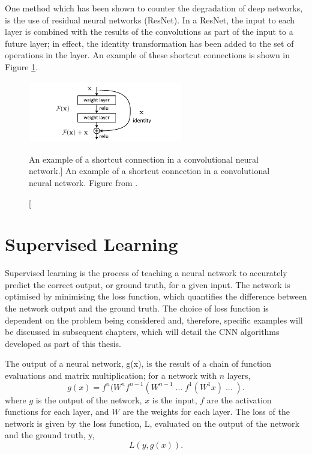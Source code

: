 One method which has been shown to counter the degradation of deep networks, 
is the use of residual neural networks (ResNet). In a ResNet, the input to 
each layer is combined with the results of the convolutions as part of the 
input to a future layer; in effect, the identity transformation has been added
to the set of operations in the layer. An example of these shortcut connections 
is shown in Figure \ref{fig:short_connect}\cite{He_2016_CVPR}. 
\begin{figure}
	\centering
	\includegraphics[width = 0.6\textwidth]{figures/short_connect.pdf}
	\caption
	[An example of a shortcut connection in a convolutional neural network.]
	{An example of a shortcut connection in a convolutional neural network.
	Figure from \cite{He_2016_CVPR}.}
	\label{fig:short_connect}
\end{figure}

\section{Supervised Learning}
Supervised learning is the process of teaching a neural network to accurately
predict the correct output, or ground truth, for a given input. The network is 
optimised by minimising the loss function, which quantifies the difference 
between the network output and the ground truth. The choice of loss function 
is dependent on the problem being considered and, therefore, specific examples 
will be discussed in subsequent chapters, which will detail the CNN algorithms 
developed as part of this thesis.

The output of a neural network, g(x), is the result of a chain of function 
evaluations and matrix multiplication; for a network with $n$ layers,
\begin{equation*}
	g(x) = f^n(W^n f^{n-1}(W^{n-1} \;...\; f^1(W^1 x) \;...\; ).
\end{equation*}
where $g$ is the output of the network, $x$ is the input, $f$ are the 
activation functions for each layer, and $W$ are the weights for each layer. 
The loss of the network is given by the loss function, L, evaluated on the 
output of the network and the ground truth, y,
\begin{equation*}
	L(y, g(x)).
\end{equation*}

